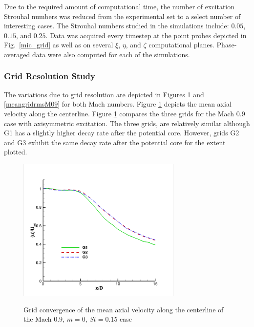 \documentclass[english]{aiaa-tc}
\begin{document}
Due to the required amount of computational time, the number of excitation Strouhal numbers was reduced from the experimental set to a select number of interesting cases.
The Strouhal numbers studied in the
simulations include: $0.05$, $0.15$, and $0.25$. Data was acquired
every timestep at the point probes depicted in Fig.~\ref{mic_grid}
as well as on several $\xi$, $\eta$, and $\zeta$ computational planes.
Phase-averaged data were also computed for each of the simulations.

\subsubsection{Grid Resolution Study}
 The variations due to grid resolution are depicted in Figures \ref{meangridM09} and \ref{meangridrmsM09} for both Mach numbers. Figure \ref{meangridM09} depicts the mean axial velocity along the centerline. Figure \ref{meangridM09} compares the three grids for the Mach 0.9 case with axisymmetric excitation. The three grids, are relatively similar although G1 has a slightly higher decay rate after the potential core. However, grids G2 and G3 exhibit the same decay rate after the potential core for the extent plotted. 
\begin{figure}
\begin{center}
\includegraphics[width=3.2in]{gridstudyM09meancenter.png}\label{meangridM09}
\caption{Grid convergence of the mean axial velocity along the centerline of the Mach 0.9, $m=0$, $St=0.15$ case}
\end{center}
 \end{figure}
\end{document}
